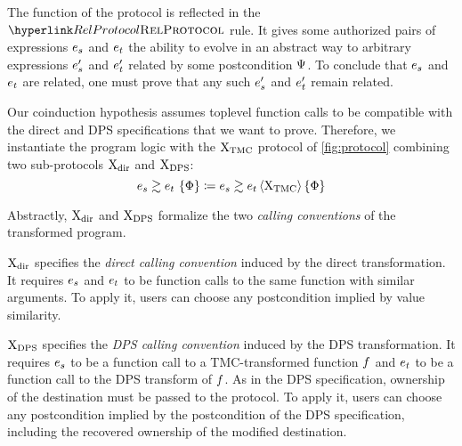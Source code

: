 The function of the protocol is reflected in the $\RefTirName{RelProtocol}$ rule.
It gives some authorized pairs of expressions $\datalangExpr_s$ and $\datalangExpr_t$ the ability to evolve in an abstract way to arbitrary expressions $\datalangExpr_s'$ and $\datalangExpr_t'$ related by some postcondition $\Psi$.
To conclude that $\datalangExpr_s$ and $\datalangExpr_t$ are related, one must prove that any such $\datalangExpr_s'$ and $\datalangExpr_t'$ remain related.

Our coinduction hypothesis assumes toplevel function calls to be compatible with the direct and DPS specifications that we want to prove.
Therefore, we instantiate the program logic with the $\mathrm{X}_\mathrm{TMC}$ protocol of \cref{fig:protocol} combining two sub-protocols $\mathrm{X}_\mathrm{dir}$ and $\mathrm{X}_\mathrm{DPS}$:
\[
    \iSimv{
        \iPred
    }{
        \datalangExpr_s
    }{
        \datalangExpr_t
    }
    \coloneqq
    \iSimv[
        \iProt_\mathrm{TMC}
    ]{
        \iPred
    }{
        \datalangExpr_s
    }{
        \datalangExpr_t
    }
\]

Abstractly, $\mathrm{X}_\mathrm{dir}$ and $\mathrm{X}_\mathrm{DPS}$ formalize the two \emph{calling conventions} of the transformed program.

$\mathrm{X}_\mathrm{dir}$ specifies the \emph{direct calling convention} induced by the direct transformation.
It requires $\datalangExpr_s$ and $\datalangExpr_t$ to be function calls to the same function with similar arguments.
To apply it, users can choose any postcondition implied by value similarity.

$\mathrm{X}_\mathrm{DPS}$ specifies the \emph{DPS calling convention} induced by the DPS transformation.
It requires $\datalangExpr_s$ to be a function call to a TMC-transformed function $\datalangFn$ and $\datalangExpr_t$ to be a function call to the DPS transform of $\datalangFn$.
As in the DPS specification, ownership of the destination must be passed to the protocol.
To apply it, users can choose any postcondition implied by the postcondition of the DPS specification, including the recovered ownership of the modified destination.

